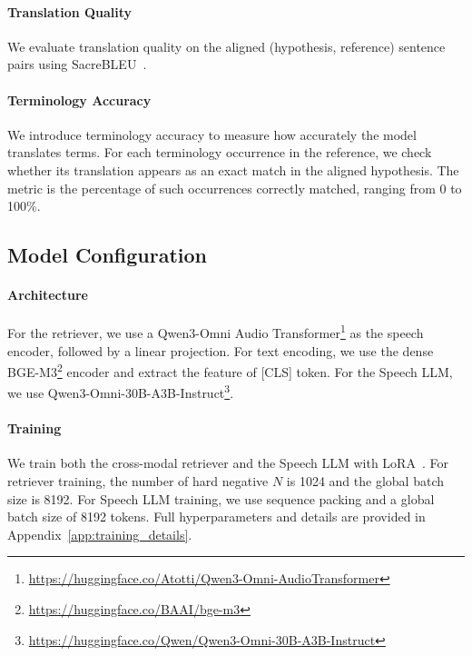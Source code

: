 \paragraph{Translation Quality}
We evaluate translation quality on the aligned (hypothesis, reference) sentence pairs using SacreBLEU~\citep{papineni-etal-2002-bleu,post-2018-call}.

\paragraph{Terminology Accuracy}
We introduce terminology accuracy to measure how accurately the model translates terms. For each terminology occurrence in the reference, we check whether its translation appears as an exact match in the aligned hypothesis. The metric is the percentage of such occurrences correctly matched, ranging from 0 to 100\%.



\subsection{Model Configuration}
\label{sec:retriever_training}

\paragraph{Architecture}
For the retriever, we use a Qwen3-Omni Audio Transformer\footnote{\url{https://huggingface.co/Atotti/Qwen3-Omni-AudioTransformer}} as the speech encoder, followed by a linear projection. For text encoding, we use the dense BGE-M3\footnote{\url{https://huggingface.co/BAAI/bge-m3}} encoder and extract the feature of \textsc{[CLS]} token. For the Speech LLM, we use Qwen3-Omni-30B-A3B-Instruct\footnote{\url{https://huggingface.co/Qwen/Qwen3-Omni-30B-A3B-Instruct}}.

\paragraph{Training}
We train both the cross-modal retriever and the Speech LLM with LoRA~\citep{hu2022lora}. For retriever training, the number of hard negative $N$ is 1024 and the global batch size is 8192. For Speech LLM training, we use sequence packing and a global batch size of 8192 tokens. Full hyperparameters and details are provided in Appendix~\ref{app:training_details}.

